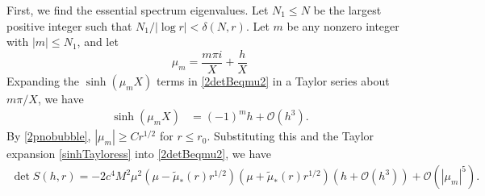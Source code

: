 \documentclass[thesis.tex]{subfiles}
\begin{document}
First, we find the essential spectrum eigenvalues. Let $N_1 \leq N$ be the largest positive integer such that $N_1/|\log r| < \delta(N,r)$. Let $m$ be any nonzero integer with $|m| \leq N_1$, and let
\begin{equation}\label{defmum}
\mu_m = \frac{m \pi i}{X} + \frac{h}{X}
\end{equation}
Expanding the $\sinh(\mu_m X)$ terms in \cref{2detBeqmu2} in a Taylor series about $m \pi/X$, we have
\begin{align}\label{sinhTayloress}
\sinh(\mu_m X) &= (-1)^m h + \mathcal{O}(h^3).
\end{align}
By \cref{2pnobubble}, $|\mu_m| \geq C r^{1/2}$ for $r \leq r_0$. Substituting this and the Taylor expansion \cref{sinhTayloress} into \cref{2detBeqmu2}, we have 
\begin{equation}\label{Bess1}
\begin{aligned}
\det S(h, r) = -2 c^4 M^2 \mu^2 (\mu - \tilde{\mu}_*(r)r^{1/2})(\mu + \tilde{\mu}_*(r)r^{1/2}) \left( h + \mathcal{O}(h^3) \right) + \mathcal{O}\left( |\mu_m|^5 \right).
\end{aligned}
\end{equation}
\end{document}
